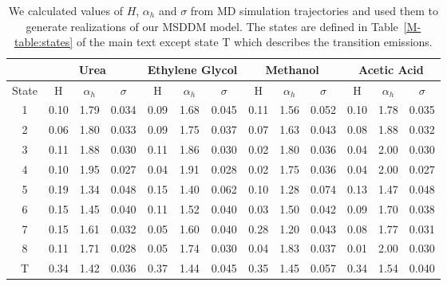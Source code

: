 \documentclass{article}
\begin{document}
  \begin{table}[h]
  \centering
  \begin{tabular}{|c|c|c|c|c|c|c|c|c|c|c|c|c|}
  \hline
  & \multicolumn{3}{c|}{Urea} & \multicolumn{3}{c|}{Ethylene Glycol} & \multicolumn{3}{c|}{Methanol} & \multicolumn{3}{c|}{Acetic Acid} \\\hline
  State & H     &$\alpha_h$& $\sigma$ & H    &$\alpha_h$& $\sigma$   & H     &$\alpha_h$& $\sigma$ & H    &$\alpha_h$& $\sigma$ \\\hline
  1     & 0.10  & 1.79     & 0.034    & 0.09 & 1.68     & 0.045      & 0.11  & 1.56     & 0.052    & 0.10 & 1.78     & 0.035    \\
  2     & 0.06  & 1.80     & 0.033    & 0.09 & 1.75     & 0.037      & 0.07  & 1.63     & 0.043    & 0.08 & 1.88     & 0.032    \\
  3     & 0.11  & 1.88     & 0.030    & 0.11 & 1.86     & 0.030      & 0.02  & 1.80     & 0.036    & 0.04 & 2.00     & 0.030    \\
  4     & 0.10  & 1.95     & 0.027    & 0.04 & 1.91     & 0.028      & 0.02  & 1.75     & 0.036    & 0.04 & 2.00     & 0.027    \\
  5     & 0.19  & 1.34     & 0.048    & 0.15 & 1.40     & 0.062      & 0.10  & 1.28     & 0.074    & 0.13 & 1.47     & 0.048    \\
  6     & 0.15  & 1.45     & 0.040    & 0.11 & 1.52     & 0.040      & 0.03  & 1.50     & 0.042    & 0.09 & 1.70     & 0.038    \\
  7     & 0.15  & 1.61     & 0.032    & 0.05 & 1.60     & 0.040      & 0.28  & 1.20     & 0.043    & 0.08 & 1.77     & 0.031    \\
  8     & 0.11  & 1.71     & 0.028    & 0.05 & 1.74     & 0.030      & 0.04  & 1.83     & 0.037    & 0.01 & 2.00     & 0.030    \\
  T     & 0.34  & 1.42     & 0.036    & 0.37 & 1.44     & 0.045      & 0.35  & 1.45     & 0.057    & 0.34 & 1.54     & 0.040    \\\hline
  \end{tabular}
  \caption{We calculated values of $H$, $\alpha_h$ and $\sigma$ from MD simulation
  trajectories and used them to generate realizations of our MSDDM model. The states
  are defined in Table~\ref{M-table:states} of the main text except state T which 
  describes the transition emissions.}\label{table:msddm_params}
  \end{table}  
  
\end{document}
